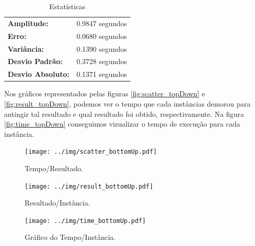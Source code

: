 \documentclass[a4paper, 12pt]{article}
\begin{document}

\begin{table}[!htb]
    \begin{tabular}{ll}
    \textbf{Amplitude:} & 0.9847 segundos \\
    \textbf{Erro:} & 0.0680 segundos \\
    \textbf{Variância:} & 0.1390 segundos \\
    \textbf{Desvio Padrão:} & 0.3728 segundos \\
    \textbf{Desvio Absoluto:} & 0.1371 segundos
    \end{tabular}
    \caption{Estatísticas}
    \label{tab:estatistica_bottomup}
\end{table}

\newpage
Nos gráficos representados pelas figuras \ref{fig:scatter_topDown} e \ref{fig:result_topDown}, podemos ver o tempo
que cada instâncias demorou para antingir tal resultado e qual resultado foi obtido, respectivamente. 
Na figura \ref{fig:time_topDown} conseguimos vizualizar o tempo de execução para cada instância.
\begin{figure}[!htb]
    \centering
    \begin{minipage}{0.55\textwidth}
        \centering
        \texttt{[image: ../img/scatter\_bottomUp.pdf]}
        \caption{Tempo/Resultado.}
        \label{fig:scatter_bottomUp}
    \end{minipage}%
    \begin{minipage}{0.55\textwidth}
        \centering
        \texttt{[image: ../img/result\_bottomUp.pdf]}
        \caption{Resultado/Instância.}
        \label{fig:result_bottomUp}
    \end{minipage}
\end{figure}

\begin{figure}[!htb]
    \centering
    \texttt{[image: ../img/time\_bottomUp.pdf]}
    \caption{Gráfico do Tempo/Instância.}
    \label{fig:time_bottomUp}
\end{figure}

\clearpage
\end{document}
